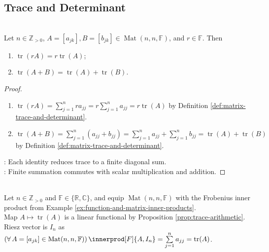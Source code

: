 \subsection{Trace and Determinant}

\begin{proposition} \label{prop:trace-arithmetic} \\
Let $n\in\mathbb{Z}_{>0}$, $A=[a_{jk}],B=[b_{jk}]\in\operatorname{Mat}(n,n,\mathbb{F})$, and $r\in\mathbb{F}$. Then
\begin{enumerate}[label=(\roman*)]
\setlength{\itemsep}{0pt}
\item $\operatorname{tr}(rA)=r\operatorname{tr}(A)$;
\item $\operatorname{tr}(A+B)=\operatorname{tr}(A)+\operatorname{tr}(B)$.
\end{enumerate}
\begin{proof}
\begin{enumerate}[label=(\roman*)]
\setlength{\itemsep}{0pt}
\item $\operatorname{tr}(rA)=\sum\limits_{j=1}^{n}ra_{jj}=r\sum\limits_{j=1}^{n}a_{jj}=r\operatorname{tr}(A)$ by Definition \ref{def:matrix-trace-and-determinant}.
\item $\operatorname{tr}(A+B)=\sum\limits_{j=1}^{n}(a_{jj}+b_{jj})=\sum\limits_{j=1}^{n}a_{jj}+\sum\limits_{j=1}^{n}b_{jj}=\operatorname{tr}(A)+\operatorname{tr}(B)$ by Definition \ref{def:matrix-trace-and-determinant}.
\end{enumerate}
: Each identity reduces trace to a finite diagonal sum.\\
: Finite summation commutes with scalar multiplication and addition.
\end{proof}
\end{proposition}

\begin{example} \label{ex:frobenius-trace-riesz-vector} \\
Let $n\in\mathbb{Z}_{>0}$ and $\mathbb{F}\in\{\mathbb{R},\mathbb{C}\}$, and equip $\operatorname{Mat}(n,n,\mathbb{F})$ with the Frobenius inner product from Example \ref{ex:function-and-matrix-inner-products}.\\
Map $A\mapsto\operatorname{tr}(A)$ is a linear functional by Proposition \ref{prop:trace-arithmetic}. Riesz vector is $I_n$ as $(\forall\,A=[a_{jk}]\in\operatorname{Mat}(n,n,\mathbb{F}))\,\innerprod[F]{A,I_n}=\sum\limits_{j=1}^{n}a_{jj}=\operatorname{tr}(A)$.
\end{example}

